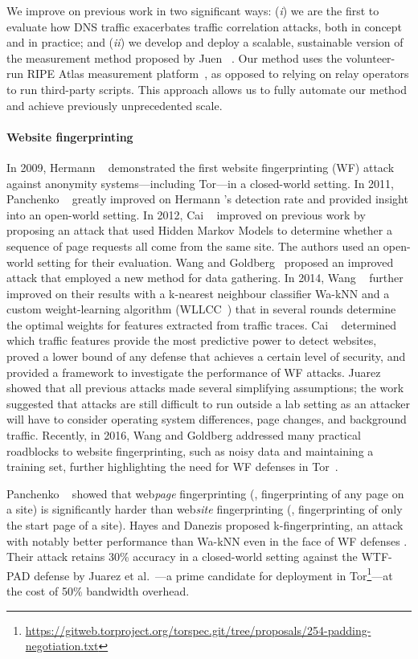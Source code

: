 We improve on previous work in two significant ways: (\emph{i}) we are
the first to evaluate how DNS traffic exacerbates traffic correlation
attacks, both in concept and in practice; and (\emph{ii}) we develop and
deploy a scalable, sustainable version of the measurement method proposed by Juen
\ea~\cite{Juen2015a}.  Our method uses the volunteer-run RIPE Atlas
measurement platform~\cite{atlas}, as opposed to relying on relay operators
to run third-party scripts.  This approach allows us to fully automate
our method and achieve previously unprecedented scale.

\paragraph{Website fingerprinting}
In 2009, Hermann \ea~\cite{Hermann2009a} demonstrated the first website
fingerprinting (WF) attack against anonymity systems---including Tor---in a
closed-world setting.  In 2011, Panchenko \ea~\cite{Panchenko2011a} greatly
improved on Hermann \ea's detection rate and provided insight into an open-world
setting.  In 2012, Cai \ea~\cite{Cai2012a} improved on previous work by
proposing an attack that used Hidden Markov Models to determine whether a sequence of
page requests all come from the same site.  The authors used an open-world
setting for their evaluation.  Wang and Goldberg~\cite{Wang2013a} proposed an
improved attack that employed a new method for data gathering.  In 2014, Wang
\ea~\cite{Wang2014a} further improved on their results with a
k-nearest neighbour classifier Wa-kNN and a custom weight-learning algorithm
(WLLCC~\cite{WangThesis}) that in several rounds determine the optimal weights
for features extracted from traffic traces.
Cai \ea~\cite{Cai2014b}
determined which traffic features provide the most predictive power to detect
websites, proved a lower bound of any defense that achieves a certain level of
security, and provided a framework to investigate the performance of
WF attacks.  Juarez~\cite{Juarez2014a} showed that all previous attacks
made several simplifying 
assumptions; the work suggested that attacks are still
difficult to run outside a lab setting as an attacker will have to consider
operating system differences, page changes, and background traffic.
Recently, in 2016, Wang and Goldberg addressed many practical
roadblocks to website fingerprinting, such as noisy data and maintaining a training set,
further highlighting the need for WF defenses in Tor~\cite{taoianreally}.

Panchenko \ea~\cite{Panchenko2016a} showed that web\emph{page}
fingerprinting (\ie, fingerprinting of any page on a site) is
significantly harder than web\emph{site} fingerprinting (\ie,
fingerprinting of only the start page of a site).  Hayes and Danezis
proposed k-fingerprinting, an attack with notably better performance
than Wa-kNN even in the face of WF defenses
\cite{kfingerprinting}. Their attack retains 30\% accuracy in a
closed-world setting against the WTF-PAD defense by Juarez et
al.~\cite{DBLP:journals/corr/JuarezIPDW15}---a prime candidate for
deployment in
Tor\footnote{\url{https://gitweb.torproject.org/torspec.git/tree/proposals/254-padding-negotiation.txt}}---at
the cost of 50\% bandwidth overhead.

